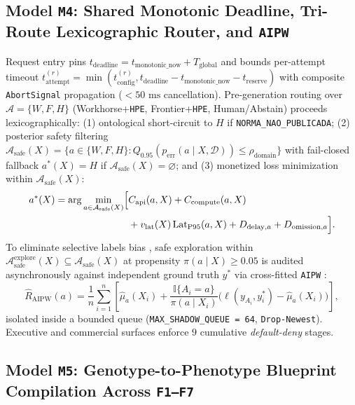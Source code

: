 \documentclass[10pt,twocolumn]{article}
\begin{document}
\subsection{Model \texttt{M4}: Shared Monotonic Deadline, Tri-Route Lexicographic Router, and \texttt{AIPW}}

Request entry pins $t_{\mathrm{deadline}} = t_{\mathrm{monotonic\_now}} + T_{\mathrm{global}}$ and bounds per-attempt timeout $t_{\mathrm{attempt}}^{(r)} = \min(t_{\mathrm{config}}^{(r)}, t_{\mathrm{deadline}} - t_{\mathrm{monotonic\_now}} - t_{\mathrm{reserve}})$ with composite \texttt{AbortSignal} propagation ($<50\text{ ms}$ cancellation). Pre-generation routing over $\mathcal{A}=\{W,F,H\}$ (Workhorse+\texttt{HPE}, Frontier+\texttt{HPE}, Human/Abstain) proceeds lexicographically: (1) ontological short-circuit to $H$ if \texttt{NORMA\_NAO\_PUBLICADA}; (2) posterior safety filtering $\mathcal{A}_{\mathrm{safe}}(X) = \{a \in \{W,F,H\} : Q_{0.95}(p_{\mathrm{err}}(a \mid X,\mathcal{D})) \le \rho_{\mathrm{domain}}\}$ with fail-closed fallback $a^*(X)=H$ if $\mathcal{A}_{\mathrm{safe}}(X)=\varnothing$; and (3) monetized loss minimization within $\mathcal{A}_{\mathrm{safe}}(X)$:
\begin{equation}
\begin{aligned}
a^*(X) = \arg\min_{a \in \mathcal{A}_{\mathrm{safe}}(X)} \Bigl[&C_{\mathrm{api}}(a,X) + C_{\mathrm{compute}}(a,X) \\
&+ v_{\mathrm{lat}}(X)\operatorname{Lat}_{\mathrm{P95}}(a,X) + D_{\mathrm{delay},a} + D_{\mathrm{omission},a}\Bigr].
\end{aligned}
\end{equation}
To eliminate selective labels bias \cite{lakkaraju2017selective}, safe exploration within $\mathcal{A}_{\mathrm{safe}}^{\mathrm{explore}}(X) \subseteq \mathcal{A}_{\mathrm{safe}}(X)$ at propensity $\pi(a\mid X)\ge 0.05$ is audited asynchronously against independent ground truth $y^*$ via cross-fitted \texttt{AIPW} \cite{robins1994estimation}:
\begin{equation}
\widehat{R}_{\mathrm{AIPW}}(a) = \frac{1}{n}\sum_{i=1}^{n}\left[\hat{\mu}_a(X_i) + \frac{\mathbb{I}\{A_i=a\}}{\pi(a\mid X_i)}\bigl(\ell(y_{A_i},y_i^*) - \hat{\mu}_a(X_i)\bigr)\right],
\end{equation}
isolated inside a bounded queue (\texttt{MAX\_SHADOW\_QUEUE = 64}, \texttt{Drop-Newest}). Executive and commercial surfaces enforce $9$ cumulative \emph{default-deny} stages.

\subsection{Model \texttt{M5}: Genotype-to-Phenotype Blueprint Compilation Across \texttt{F1--F7}}
\end{document}
